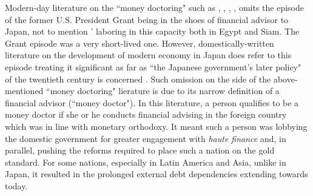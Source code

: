 Modern-day literature on the ``money doctoring" such as \cite{rosenberg1999}, \cite{fland2003}, \cite{schiltz2012}, \cite{moneydoctors2021}, \cite{alvarez2024} omits the episode of the former U.S. President Grant being in the shoes of financial advisor to Japan, not to mention \citeauthor{innes1896}' laboring in this capacity both in Egypt and Siam. The Grant episode was a very short-lived one. However, domestically-written literature on the development of modern economy in Japan does refer to this episode treating it significant as far as ``the Japanese government's later policy" of the twentieth century is concerned \citep[p.~186]{takahashi1969}. Such omission on the side of the above-mentioned ``money doctoring" lierature is due to its narrow definition of a financial advisor (``money doctor"). In this literature, a person qualifies to be a money doctor if she or he conducts financial advising in the foreign country which was in line with monetary orthodoxy. It meant such a person was lobbying the domestic government for greater engagement with \textit{haute finance} and, in parallel, pushing the reforms required to place such a nation on the gold standard. For some nations, especially in Latin America and Asia, unlike in Japan, it resulted in the prolonged external debt dependencies extending towards today. 

